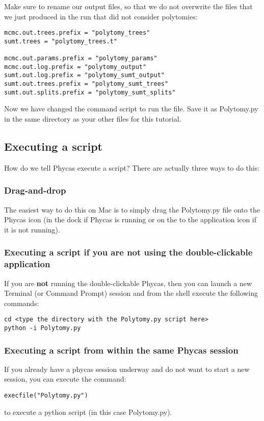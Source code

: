 \documentclass{article}
\newcommand{\phycas}{Phycas\xspace}
\newcommand{\localfile}[1]{\textsf{#1}\xspace}
\begin{document}
Make sure to rename our output files, so that we do not overwrite the files that we just produced
in the run that did not consider polytomies:
\begin{verbatim}
mcmc.out.trees.prefix = "polytomy_trees"
sumt.trees = "polytomy_trees.t"

mcmc.out.params.prefix = "polytomy_params"
mcmc.out.log.prefix = "polytomy_output"
sumt.out.log.prefix = "polytomy_sumt_output"
sumt.out.trees.prefix = "polytomy_sumt_trees"
sumt.out.splits.prefix = "polytomy_sumt_splits"
\end{verbatim}

Now we have changed the command script to run the file. Save it as \localfile{Polytomy.py} in the same directory as your other files for this tutorial.

\subsection{Executing a script}
How do we tell \phycas execute a script?
There are actually three ways to do this:
\subsubsection{Drag-and-drop}
The easiest way to do this on Mac is to simply drag the \localfile{Polytomy.py} file onto the \phycas icon (in the dock if \phycas is running or on the to the application icon if it is not running).

\subsubsection{Executing a script if you are not using the double-clickable application}
If you are {\bf not} running the double-clickable \phycas, then you can launch a new
Terminal (or Command Prompt) session and from the shell execute the following commands:
\begin{verbatim}
cd <type the directory with the Polytomy.py script here>
python -i Polytomy.py
\end{verbatim}

\subsubsection{Executing a script from within the same \phycas session}
If you already have a phycas session underway and do not want to start a
new session, you can execute the command:
\begin{verbatim}
execfile("Polytomy.py")
\end{verbatim}
to execute a python script (in this case  \localfile{Polytomy.py}).
\end{document}
